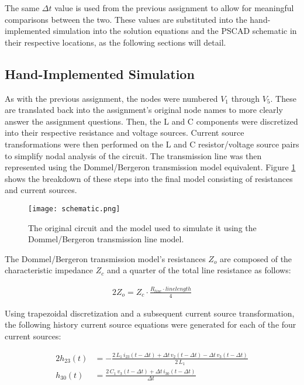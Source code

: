 \documentclass[10pt, oneside, letterpaper]{article}
\begin{document}
The same $\Delta{}t$ value is used from the previous assignment to allow for meaningful comparisons between the two. These values are substituted into the hand-implemented simulation into the solution equations and the PSCAD schematic in their respective locations, as the following sections will detail.

\subsection{Hand-Implemented Simulation}

As with the previous assignment, the nodes were numbered $V_1$ through $V_5$. These are translated back into the assignment's original node names to more clearly answer the assignment questions. Then, the L and C components were discretized into their respective resistance and voltage sources. Current source transformations were then performed on the L and C resistor/voltage source pairs to simplify nodal analysis of the circuit. The transmission line was then represented using the Dommel/Bergeron transmission model equivalent. Figure \ref{hand-setup} shows the breakdown of these steps into the final model consisting of resistances and current sources.

\begin{figure}[H]
\centering
\texttt{[image: schematic.png]}
\caption{The original circuit and the model used to simulate it using the Dommel/Bergeron transmission line model.}
\label{hand-setup}
\end{figure}

The Dommel/Bergeron transmission model's resistances $Z_o$ are composed of the characteristic impedance $Z_c$ and a quarter of the total line resistance as follows:

\begin{alignat}{2}
Z_o = Z_c \cdot{} \frac{R_{line}\cdot{}linelength}{4}
\end{alignat}

Using trapezoidal discretization and a subsequent current source transformation, the following history current source equations were generated for each of the four current sources:

\begin{alignat}{2}
h_{23}(t) &= -\frac{2\,L_{1}\,i_{23}(t - \Delta{}t)+\Delta{}t\,v_{2}(t - \Delta{}t)-\Delta{}t\,v_{3}(t - \Delta{}t)}{2\,L_{1}}\\
h_{30}(t) &= \frac{2\,C_{1}\,v_{3}(t - \Delta{}t)+\Delta{}t\,i_{30}(t - \Delta{}t)}{\Delta{}t}\\ 
\end{alignat}
\end{document}
